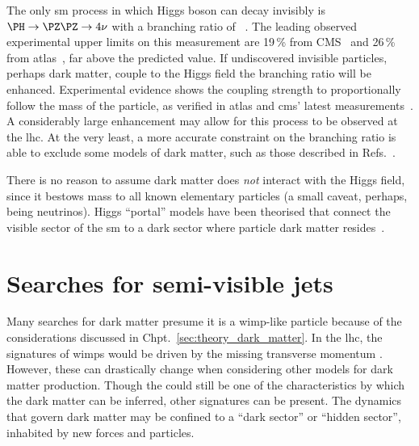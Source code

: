 The only \acrshort{sm} process in which Higgs boson can decay invisibly is $\PH \rightarrow \PZ\PZ \rightarrow 4\nu$ with a branching ratio of ~\cite{Heinemeyer:1559921}. The leading observed experimental upper limits on this measurement are 19\,\% from CMS~\cite{Sirunyan:2018owy} and 26\,\% from \acrshort{atlas}~\cite{Aaboud:2019rtt}, far above the predicted value. If undiscovered invisible particles, perhaps dark matter, couple to the Higgs field the branching ratio will be enhanced. Experimental evidence shows the coupling strength to proportionally follow the mass of the particle, as verified in \acrshort{atlas} and \acrshort{cms}' latest measurements~\cite{Sopczak:2708121}. A considerably large enhancement may allow for this process to be observed at the \acrshort{lhc}. At the very least, a more accurate constraint on the branching ratio is able to exclude some models of dark matter, such as those described in Refs.~.

There is no reason to assume dark matter does \emph{not} interact with the Higgs field, since it bestows mass to all known elementary particles (a small caveat, perhaps, being neutrinos). Higgs ``portal'' models have been theorised that connect the visible sector of the \acrlong{sm} to a dark sector where particle dark matter resides~\cite{higgs_portal_singlet_dm,Arcadi:2019lka}.





\section{Searches for semi-visible jets}
\label{sec:theory_svj}


Many searches for dark matter presume it is a \acrshort{wimp}-like particle because of the considerations discussed in Chpt.~\ref{sec:theory_dark_matter}. In the \acrshort{lhc}, the signatures of \glspl{wimp} would be driven by the missing transverse momentum \ptmiss. However, these can drastically change when considering other models for dark matter production. Though the \ptmiss could still be one of the characteristics by which the dark matter can be inferred, other signatures can be present. The dynamics that govern dark matter may be confined to a ``dark sector'' or ``hidden sector'', inhabited by new forces and particles.

